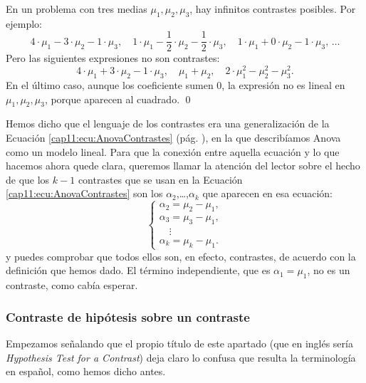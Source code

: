 \begin{ejemplo}
En un problema con tres medias $\mu_1,\mu_2,\mu_3$, hay infinitos contrastes posibles. Por ejemplo:
\[4\cdot\mu_1-3\cdot\mu_2-1\cdot\mu_3,\quad
1\cdot\mu_1-\dfrac{1}{2}\cdot\mu_2-\dfrac{1}{2}\cdot\mu_3,\quad
1\cdot\mu_1+0\cdot\mu_2-1\cdot\mu_3,\,\ldots
\]
Pero las siguientes expresiones no son contrastes:
\[
4\cdot\mu_1+3\cdot\mu_2-1\cdot\mu_3,\quad
\mu_1+\mu_2,\quad
2\cdot\mu_1^2-\mu_2^2-\mu_3^2.
\]
En el último caso, aunque los coeficiente sumen $0$, la expresión no es lineal en
$\mu_1,\mu_2,\mu_3$, porque aparecen al cuadrado. \qed
\end{ejemplo}
Hemos dicho que el lenguaje de los contrastes era una generalización de la Ecuación
\ref{cap11:ecu:AnovaContrastes} (pág. \pageref{cap11:ecu:AnovaContrastes}), en la que describíamos
Anova como un modelo lineal. Para que la conexión entre aquella ecuación y lo que hacemos ahora
quede clara, queremos llamar la atención del lector sobre el hecho de que los $k-1$ contrastes que se
usan en la Ecuación \ref{cap11:ecu:AnovaContrastes} son los $\alpha_2$,\ldots,$\alpha_k$ que
aparecen en esa ecuación:
\[
\begin{cases}
\alpha_2=\mu_2-\mu_1,\\
\alpha_3=\mu_3-\mu_1,\\
\quad\vdots\\
\alpha_k=\mu_k-\mu_1.
\end{cases}
\]
y puedes comprobar que todos ellos son, en efecto, contrastes, de acuerdo con la definición que
hemos dado. El término independiente, que es $\alpha_1=\mu_1$, no es un contraste, como cabía
esperar.

\subsubsection{Contraste de hipótesis sobre un contraste}
\label{cap11:subsubsec:ContrasteHipotesis}

Empezamos señalando que el propio título de este apartado (que en inglés sería {\em Hypothesis Test for a Contrast}) deja claro lo confusa que resulta la terminología en español, como hemos dicho antes.

